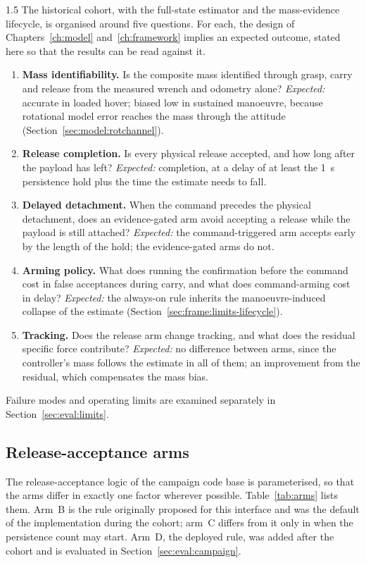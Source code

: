 \begin{spacing}{1.5}
The historical cohort, with the full-state estimator and the mass-evidence
lifecycle, is organised around five questions. For each, the design of
Chapters~\ref{ch:model} and~\ref{ch:framework} implies an expected outcome,
stated here so that the results can be read against it.
\begin{enumerate}
\item[\textbf{Q1}] \textbf{Mass identifiability.} Is the composite mass
identified through grasp, carry and release from the measured wrench and
odometry alone? \emph{Expected:} accurate in loaded hover; biased low in
sustained manoeuvre, because rotational model error reaches the mass through the
attitude (Section~\ref{sec:model:rotchannel}).
\item[\textbf{Q2}] \textbf{Release completion.} Is every physical release
accepted, and how long after the payload has left? \emph{Expected:} completion,
at a delay of at least the \SI{1}{\second} persistence hold plus the time the
estimate needs to fall.
\item[\textbf{Q3}] \textbf{Delayed detachment.} When the command precedes the
physical detachment, does an evidence-gated arm avoid accepting a release while
the payload is still attached? \emph{Expected:} the command-triggered arm accepts
early by the length of the hold; the evidence-gated arms do not.
\item[\textbf{Q4}] \textbf{Arming policy.} What does running the confirmation
before the command cost in false acceptances during carry, and what does
command-arming cost in delay? \emph{Expected:} the always-on rule inherits the
manoeuvre-induced collapse of the estimate (Section~\ref{sec:frame:limits-lifecycle}).
\item[\textbf{Q5}] \textbf{Tracking.} Does the release arm change tracking, and
what does the residual specific force contribute? \emph{Expected:} no difference
between arms, since the controller's mass follows the estimate in all of them;
an improvement from the residual, which compensates the mass bias.
\end{enumerate}
Failure modes and operating limits are examined separately in
Section~\ref{sec:eval:limits}.

\subsection{Release-acceptance arms}\label{sec:eval:arms}

The release-acceptance logic of the campaign code base is parameterised, so that
the arms differ in exactly one factor wherever possible. Table~\ref{tab:arms}
lists them. Arm~B is the rule originally proposed for this interface and was the
default of the implementation during the cohort; arm~C differs from it only in
when the persistence count may start. Arm~D, the deployed rule, was added after
the cohort and is evaluated in Section~\ref{sec:eval:campaign}.


\end{spacing}
